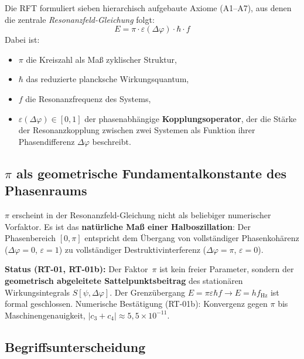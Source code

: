 \documentclass[a4paper,11pt]{article}
\begin{document}
	Die RFT formuliert sieben hierarchisch aufgebaute Axiome
	(A1--A7), aus denen die zentrale
	\textit{Resonanzfeld-Gleichung} folgt:
	\begin{equation}
		E = \pi \cdot \varepsilon(\Delta\varphi) \cdot \hbar \cdot f
	\end{equation}
	Dabei ist:
	\begin{itemize}
		\item $\pi$ die Kreiszahl als Ma\ss{} zyklischer Struktur,
		\item $\hbar$ das reduzierte plancksche Wirkungsquantum,
		\item $f$ die Resonanzfrequenz des Systems,
		\item $\varepsilon(\Delta\varphi) \in [0,1]$ der
		phasenabh\"angige \textbf{Kopplungsoperator}, der die
		St\"arke der Resonanzkopplung zwischen zwei Systemen
		als Funktion ihrer Phasendifferenz $\Delta\varphi$
		beschreibt.
	\end{itemize}
	
	\subsection{\texorpdfstring{$\pi$}{pi} als geometrische Fundamentalkonstante des Phasenraums}

	$\pi$ erscheint in der Resonanzfeld-Gleichung nicht als beliebiger numerischer
	Vorfaktor. Es ist das \textbf{nat\"urliche Ma\ss{} einer Halboszillation}: Der
	Phasenbereich $[0,\pi]$ entspricht dem \"Ubergang von vollst\"andiger
	Phasenkoh\"arenz ($\Delta\varphi = 0$, $\varepsilon = 1$) zu vollst\"andiger
	Destruktivinterferenz ($\Delta\varphi = \pi$, $\varepsilon = 0$).

	\textbf{Status (RT-01, RT-01b):} Der Faktor~$\pi$ ist kein freier Parameter,
	sondern der \textbf{geometrisch abgeleitete Sattelpunktsbeitrag} des station\"aren
	Wirkungsintegrals $S[\psi, \Delta\varphi]$. Der Grenz\"ubergang
	$E = \pi\varepsilon\hbar f \to E = hf_{\mathrm{Hz}}$ ist formal geschlossen.
	Numerische Best\"atigung (RT-01b): Konvergenz gegen $\pi$ bis
	Maschinengenauigkeit, $|c_3 + c_4| \approx 5{,}5 \times 10^{-11}$.

	\subsection{Begriffsunterscheidung}
	
\end{document}
